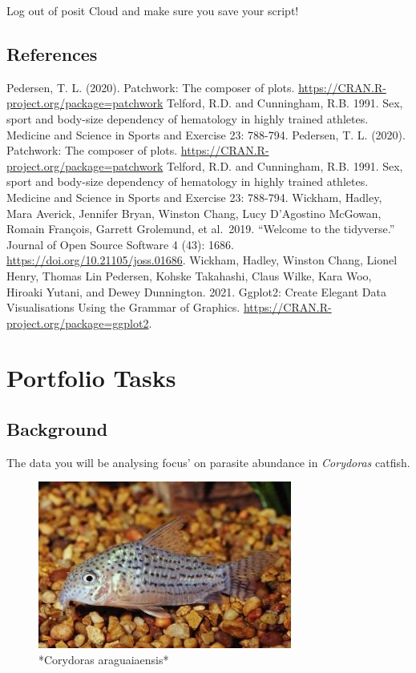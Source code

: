 \documentclass[
]{book}
\begin{document}
Log out of posit Cloud and make sure you save your script!

\hypertarget{references-10}{%
\section{References}\label{references-10}}

Pedersen, T. L. (2020). Patchwork: The composer of plots. \url{https://CRAN.R-project.org/package=patchwork}
Telford, R.D. and Cunningham, R.B. 1991. Sex, sport and body-size dependency of hematology in highly trained athletes. Medicine and Science in Sports and Exercise 23: 788-794. Pedersen, T. L. (2020). Patchwork: The composer of plots. \url{https://CRAN.R-project.org/package=patchwork}
Telford, R.D. and Cunningham, R.B. 1991. Sex, sport and body-size dependency of hematology in highly trained athletes. Medicine and Science in Sports and Exercise 23: 788-794.
Wickham, Hadley, Mara Averick, Jennifer Bryan, Winston Chang, Lucy D'Agostino McGowan, Romain François, Garrett Grolemund, et al.~2019. ``Welcome to the tidyverse.'' Journal of Open Source Software 4 (43): 1686. \url{https://doi.org/10.21105/joss.01686}.
Wickham, Hadley, Winston Chang, Lionel Henry, Thomas Lin Pedersen, Kohske Takahashi, Claus Wilke, Kara Woo, Hiroaki Yutani, and Dewey Dunnington. 2021. Ggplot2: Create Elegant Data Visualisations Using the Grammar of Graphics. \url{https://CRAN.R-project.org/package=ggplot2}.

\hypertarget{portfolio-tasks}{%
\chapter{Portfolio Tasks}\label{portfolio-tasks}}

\hypertarget{background}{%
\section{Background}\label{background}}

The data you will be analysing focus' on parasite abundance in \emph{Corydoras} catfish.

\begin{figure}
\includegraphics[width=0.9\linewidth]{figures/cory} \caption{*Corydoras araguaiaensis*}\label{fig:unnamed-chunk-80}
\end{figure}
\end{document}
